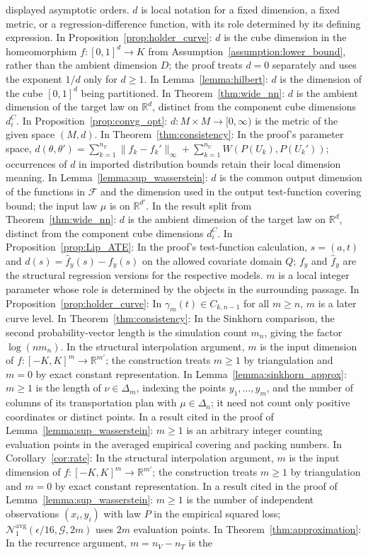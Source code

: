 \documentclass[12pt]{article}
\theoremstyle{plain}
\theoremstyle{definition}
\theoremstyle{remark}
\begin{document}
displayed asymptotic orders. $d$ is local notation for a fixed dimension, a fixed metric, or a regression-difference function, with its role determined by its defining expression. In Proposition~\ref{prop:holder_curve}: $d$ is the cube dimension in the homeomorphism $f:[0,1]^d\rightarrow K$ from Assumption~\ref{assumption:lower_bound}, rather than the ambient dimension $D$; the proof treats $d=0$ separately and uses the exponent $1/d$ only for $d\geqslant1$. In Lemma~\ref{lemma:hilbert}: $d$ is the dimension of the cube $[0,1]^d$ being partitioned. In Theorem~\ref{thm:wide_nn}: $d$ is the ambient dimension of the target law on $\mathbb{R}^d$, distinct from the component cube dimensions $d_i^C$. In Proposition~\ref{prop:convg_opt}: $d:M\times M\rightarrow[0,\infty)$ is the metric of the given space $(M,d)$. In Theorem~\ref{thm:consistency}: In the proof's parameter space, $d(\theta,\theta')=\sum_{k=1}^{n_V}\|f_k-f_k'\|_\infty+\sum_{k=1}^{n_U}W(P(U_k),P(U_k'))$; occurrences of $d$ in imported distribution bounds retain their local dimension meaning. In Lemma~\ref{lemma:sup_wasserstein}: $d$ is the common output dimension of the functions in $\mathcal F$ and the dimension used in the output test-function covering bound; the input law $\mu$ is on $\mathbb R^{d'}$. In the result split from Theorem~\ref{thm:wide_nn}: $d$ is the ambient dimension of the target law on $\mathbb R^d$, distinct from the component cube dimensions $d_i^C$. In Proposition~\ref{prop:Lip_ATE}: In the proof's test-function calculation, $s=(a,t)$ and $d(s)=\hat f_y(s)-f_y(s)$ on the allowed covariate domain $Q$; $f_y$ and $\hat f_y$ are the structural regression versions for the respective models. $m$ is a local integer parameter whose role is determined by the objects in the surrounding passage. In Proposition~\ref{prop:holder_curve}: In $\gamma_m(t)\in C_{k,n-1}$ for all $m\geqslant n$, $m$ is a later curve level. In Theorem~\ref{thm:consistency}: In the Sinkhorn comparison, the second probability-vector length is the simulation count $m_n$, giving the factor $\log(nm_n)$. In the structural interpolation argument, $m$ is the input dimension of $f:[-K,K]^m\rightarrow\mathbb R^{m'}$; the construction treats $m\geqslant1$ by triangulation and $m=0$ by exact constant representation. In Lemma~\ref{lemma:sinkhorn_approx}: $m\geqslant1$ is the length of $\nu\in\Delta_m$, indexing the points $y_1,\ldots,y_m$, and the number of columns of its transportation plan with $\mu\in\Delta_n$; it need not count only positive coordinates or distinct points. In a result cited in the proof of Lemma~\ref{lemma:sup_wasserstein}: $m\geqslant1$ is an arbitrary integer counting evaluation points in the averaged empirical covering and packing numbers. In Corollary~\ref{cor:rate}: In the structural interpolation argument, $m$ is the input dimension of $f:[-K,K]^m\rightarrow\mathbb R^{m'}$; the construction treats $m\geqslant1$ by triangulation and $m=0$ by exact constant representation. In a result cited in the proof of Lemma~\ref{lemma:sup_wasserstein}: $m\geqslant1$ is the number of independent observations $(x_i,y_i)$ with law $P$ in the empirical squared loss; $\mathcal N_1^{\mathrm{avg}}(\epsilon/16,\mathcal G,2m)$ uses $2m$ evaluation points. In Theorem~\ref{thm:approximation}: In the recurrence argument, $m=n_V-n_T$ is the 
\end{document}
